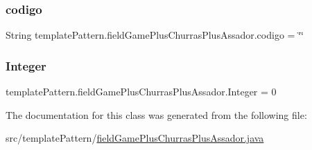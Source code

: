 \subsubsection{\texorpdfstring{codigo}{codigo}}
{\footnotesize\ttfamily String template\+Pattern.\+field\+Game\+Plus\+Churras\+Plus\+Assador.\+codigo = \char`\"{}\char`\"{}}

\mbox{\label{classtemplate_pattern_1_1field_game_plus_churras_plus_assador_a700fcb1b64fe2fb3268e4df7f6750c2d}} 
\subsubsection{\texorpdfstring{Integer}{Integer}}
{\footnotesize\ttfamily template\+Pattern.\+field\+Game\+Plus\+Churras\+Plus\+Assador.\+Integer = 0}



The documentation for this class was generated from the following file\+:\begin{DoxyCompactItemize}
\item 
src/template\+Pattern/\mbox{\hyperlink{field_game_plus_churras_plus_assador_8java}{field\+Game\+Plus\+Churras\+Plus\+Assador.\+java}}\end{DoxyCompactItemize}
